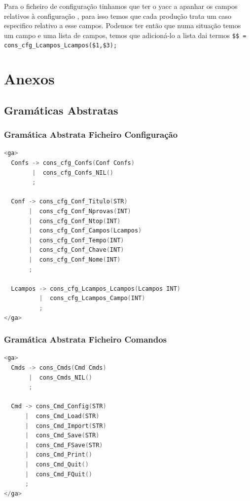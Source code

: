 \documentclass[11pt, a4paper, oneside]{article}
\begin{document}
Para o ficheiro de configuração tinhamos que ter o yacc a apanhar os campos relativos à configuração , para isso temos que cada produção trata um caso especifico relativo a esse campos. Podemos ter então que numa situação temos um campo  e uma lista de campos, temos que adicioná-lo a lista dai termos \texttt{\$\$ = cons\_cfg\_Lcampos\_Lcampos(\$1,\$3); }




\newpage

\section{Anexos}
\label{sec:Anexos}
\subsection{Gramáticas Abstratas}
\subsubsection{Gramática Abstrata Ficheiro Configuração}
\begin{lstlisting}[language=C++, caption={Gramática Abstrata do Ficheiro de Configuração}]
<ga>
  Confs -> cons_cfg_Confs(Conf Confs)
        |  cons_cfg_Confs_NIL()
        ;

  Conf -> cons_cfg_Conf_Titulo(STR)
       |  cons_cfg_Conf_Nprovas(INT)
       |  cons_cfg_Conf_Ntop(INT)
       |  cons_cfg_Conf_Campos(Lcampos)
       |  cons_cfg_Conf_Tempo(INT)
       |  cons_cfg_Conf_Chave(INT)
       |  cons_cfg_Conf_Nome(INT)
       ;

  Lcampos -> cons_cfg_Lcampos_Lcampos(Lcampos INT)
          |  cons_cfg_Lcampos_Campo(INT)
          ;
</ga>
\end{lstlisting}

\subsubsection{Gramática Abstrata Ficheiro Comandos}
\begin{lstlisting}[language=C++, caption={Gramática Abstrata do Ficheiro de Comandos}]
<ga>
  Cmds -> cons_Cmds(Cmd Cmds)
       |  cons_Cmds_NIL()
       ;

  Cmd -> cons_Cmd_Config(STR)
      |  cons_Cmd_Load(STR)
      |  cons_Cmd_Import(STR)
      |  cons_Cmd_Save(STR)
      |  cons_Cmd_FSave(STR)
      |  cons_Cmd_Print()
      |  cons_Cmd_Quit()
      |  cons_Cmd_FQuit()
      ;
</ga>
\end{lstlisting}
\end{document}
